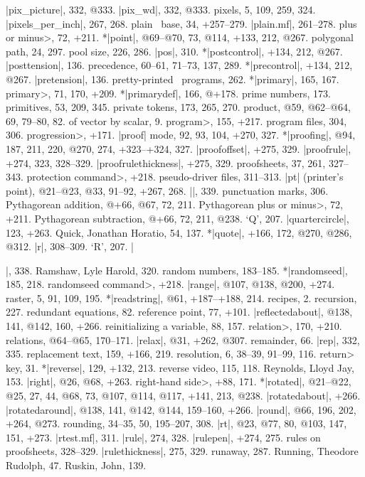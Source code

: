 |pix_picture|, 332, @333.
|pix_wd|, 332, @333.
pixels, 5, 109, 259, 324.
|pixels_per_inch|, 267, 268.
plain \MF\ base, 34, +257--279.
|plain.mf|, 261--278.
\<plus or minus>, 72, +211.
*|point|, @69--@70, 73, @114, +133, 212, @267.
polygonal path, 24, 297.
pool size, 226, 286.
|pos|, 310.
*|postcontrol|, +134, 212, @267.
|posttension|, 136.
precedence, 60--61, 71--73, 137, 289.
*|precontrol|, +134, 212, @267.
|pretension|, 136.
pretty-printed \MF\ programs, 262.
*|primary|, 165, 167.
\<primary>, 71, 170, +209.
*|primarydef|, 166, @+178.
prime numbers, 173.
primitives, 53, 209, 345.
private tokens, 173, 265, 270.
product, @59, @62--@64, 69, 79--80, 82.
\sub of vector by scalar, 9.
\<program>, 155, +217.
program files, 304, 306.
\<progression>, +171.
|proof| mode, 92, 93, 104, +270, 327.
*|proofing|, @94, 187, 211, 220, @270, 274, +323--+324, 327.
|proofoffset|, +275, 329.
|proofrule|, +274, 323, 328--329.
|proofrulethickness|, +275, 329.
proofsheets, 37, 261, 327--343.
\<protection command>, +218.
pseudo-driver files, 311--313.
|pt| (printer's point), @21--@23, @33, 91--92, +267, 268.
|\punct|, 339.
punctuation marks, 306.
Pythagorean addition, @+66, @67, 72, 211.
\<Pythagorean plus or minus>, 72, +211.
Pythagorean subtraction, @+66, 72, 211, @238.
\newletter
`Q', 207.
|quartercircle|, 123, +263.
Quick, Jonathan Horatio, 54, 137.
*|quote|, +166, 172, @270, @286, @312.
\newletter
|r|, 308--309.
`R', 207.
|\raggedright|, 338.
Ramshaw, Lyle Harold, 320.
random numbers, 183--185.
*|randomseed|, 185, 218.
\<randomseed command>, +218.
|range|, @107, @138, @200, +274.
raster, 5, 91, 109, 195.
*|readstring|, @61, +187--+188, 214.
recipes, 2.
recursion, 227.
redundant equations, 82.
reference point, 77, +101.
|reflectedabout|, @138, 141, @142, 160, +266.
reinitializing a variable, 88, 157.
\<relation>, 170, +210.
relations, @64--@65, 170--171.
|relax|, @31, +262, @307.
remainder, 66.
|rep|, 332, 335.
replacement text, 159, +166, 219.
resolution, 6, 38--39, 91--99, 116.
\<return> key, 31.
*|reverse|, 129, +132, 213.
reverse video, 115, 118.
Reynolds, Lloyd Jay, 153.
|right|, @26, @68, +263.
\<right-hand side>, +88, 171.
*|rotated|, @21--@22, @25, 27, 44, @68, 73, @107, @114, @117, +141, 213, @238.
|rotatedabout|, +266.
|rotatedaround|, @138, 141, @142, @144, 159--160, +266.
|round|, @66, 196, 202, +264, @273.
rounding, 34--35, 50, 195--207, 308.
|rt|, @23, @77, 80, @103, 147, 151, +273.
|rtest.mf|, 311.
|rule|, 274, 328.
|rulepen|, +274, 275.
rules on proofsheets, 328--329.
|rulethickness|, 275, 329.
runaway, 287.
Running, Theodore Rudolph, 47.
Ruskin, John, 139.
\newletter
